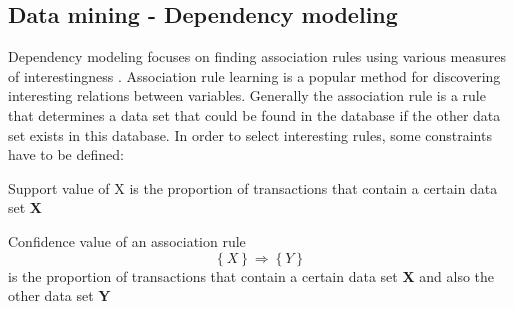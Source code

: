 \subsection{Data mining - Dependency modeling}
Dependency modeling focuses on finding association rules using various measures of interestingness \cite{association-rules}. Association rule learning is a popular method for discovering interesting relations between variables. Generally the association rule is a rule that determines a data set that could be found in the database if the other data set exists in this database. In order to select interesting rules, some constraints have to be defined:
 \begin{definition}[Support]
 	\label{support}
 	Support value of X is the proportion of transactions that contain a certain data set \textbf{X}
 	
 \end{definition}
  \begin{definition}[Confidence]
  	\label{confidence}
  	Confidence value of an association rule \[\left \{ X \right \} \Rightarrow \left \{ Y\right \}\] is the proportion of transactions that contain a certain data set \textbf{X} and also the other data set \textbf{Y}
  	
  \end{definition}

